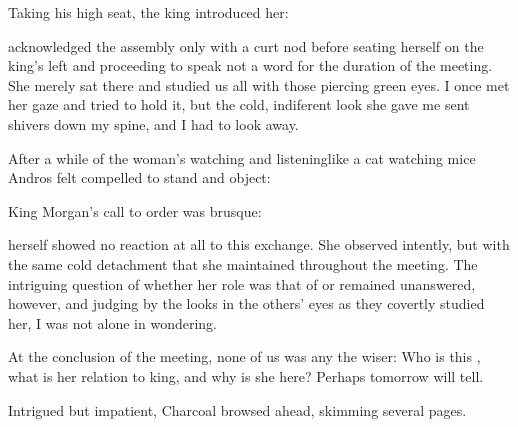 \begin{diary}
Taking his high seat, the king introduced her: 


\Takestsha{} acknowledged the assembly only with a curt nod before seating herself on the king's left and proceeding to speak not a word for the duration of the meeting. She merely sat there and studied us all with those piercing green eyes. I once met her gaze and tried to hold it, but the cold, indiferent look she gave me sent shivers down my spine, and I had to look away. 

After a while of the woman's watching and listening\dash like a cat watching mice\dash {} Andros felt compelled to stand and object: 


King Morgan's call to order was brusque: 

\Takestsha{} herself showed no reaction at all to this exchange. She observed intently, but with the same cold detachment that she maintained throughout the meeting. The intriguing question of whether her role was that of  or  remained unanswered, however, and judging by the looks in the others' eyes as they covertly studied her, I was not alone in wondering. 

At the conclusion of the meeting, none of us was any the wiser: Who is this \Takestsha, what is her relation to king, and why is she here? Perhaps tomorrow will tell.
\end{diary}



\noindent
{} 
Intrigued but impatient, Charcoal browsed ahead, skimming several pages.







